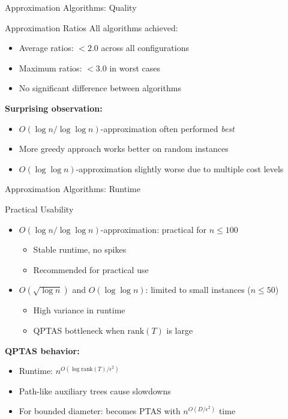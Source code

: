 \documentclass[aspectratio=169]{beamer}
\begin{document}
\begin{frame}{Approximation Algorithms: Quality}
\begin{block}{Approximation Ratios}
All algorithms achieved:
\begin{itemize}
    \item Average ratios: $< 2.0$ across all configurations
    \item Maximum ratios: $< 3.0$ in worst cases
    \item No significant difference between algorithms
\end{itemize}
\end{block}

\pause

\textbf{Surprising observation:}
\begin{itemize}
    \item $O(\log n / \log \log n)$-approximation often performed \textit{best}
    \item More greedy approach works better on random instances
    \item $O(\log \log n)$-approximation slightly worse due to multiple cost levels
\end{itemize}
\end{frame}

\begin{frame}{Approximation Algorithms: Runtime}
\begin{block}{Practical Usability}
\begin{itemize}
    \item $O(\log n / \log \log n)$-approximation: practical for $n \leq 100$
    \begin{itemize}
        \item Stable runtime, no spikes
        \item Recommended for practical use
    \end{itemize}
    \item $O(\sqrt{\log n})$ and $O(\log \log n)$: limited to small instances ($n \leq 50$)
    \begin{itemize}
        \item High variance in runtime
        \item QPTAS bottleneck when $\text{rank}(T)$ is large
    \end{itemize}
\end{itemize}
\end{block}

\pause

\textbf{QPTAS behavior:}
\begin{itemize}
    \item Runtime: $n^{O(\log \text{rank}(T) / \epsilon^2)}$
    \item Path-like auxiliary trees cause slowdowns
    \item For bounded diameter: becomes PTAS with $n^{O(D/\epsilon^2)}$ time
\end{itemize}
\end{frame}
\end{document}
